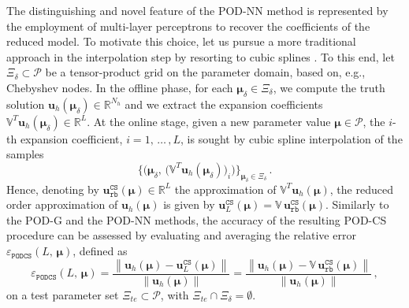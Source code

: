 \documentclass[longtitle]{elsarticle}
\numberwithin{equation}{section}
\theoremstyle{theorem}
\theoremstyle{definition}
\theoremstyle{remark}
\theoremstyle{proposition}
\numberwithin{figure}{section}
\newcommand{\norm}[1]{\left\lVert#1\right\rVert}
\newcommand{\bg}[1]{\boldsymbol{#1}}
\begin{document}
		The distinguishing and novel feature of the POD-NN method is represented by the employment of multi-layer perceptrons to recover the coefficients of the reduced model. To motivate this choice, let us pursue a more traditional approach in the interpolation step by resorting to cubic splines \cite{Deb78}. To this end, let $\Xi_{\delta} \subset \mathcal{P}$ be a tensor-product grid on the parameter domain, based on, e.g., Chebyshev nodes. In the offline phase, for each $\bg{\mu}_{\delta} \in \Xi_{\delta}$, we compute the truth solution $\mathbf{u}_h(\bg{\mu}_{\delta}) \in \mathbb{R}^{N_h}$ and we extract the expansion coefficients $\mathbb{V}^T \mathbf{u}_h(\bg{\mu}_{\delta}) \in \mathbb{R}^L$. At the online stage, given a new parameter value $\bg{\mu} \in \mathcal{P}$, the $i$-th expansion coefficient, $i = 1, \, \ldots \, , L$, is sought by cubic spline interpolation of the samples \[ \big\lbrace \big( \bg{\mu}_{\delta}, \, \big( \mathbb{V}^T \mathbf{u}_h(\bg{\mu}_{\delta}) \big)_i \big) \big\rbrace_{\bg{\mu}_{\delta} \in \Xi_{\delta}} \, . \] Hence, denoting by $\mathbf{u}_{\texttt{rb}}^{\texttt{CS}}(\bg{\mu}) \in \mathbb{R}^L$ the approximation of $\mathbb{V}^T \mathbf{u}_h(\bg{\mu})$, the reduced order approximation of $\mathbf{u}_h(\bg{\mu})$ is given by $\mathbf{u}_L^{\texttt{CS}}(\bg{\mu}) = \mathbb{V} \, \mathbf{u}_{\texttt{rb}}^{\texttt{CS}}(\bg{\mu})$. Similarly to the POD-G and the POD-NN methods, the accuracy of the resulting POD-CS procedure can be assessed by evaluating and averaging the relative error $\varepsilon_{\texttt{PODCS}}^{}(L, \, \bg{\mu})$, defined as
		\begin{equation*}
			\label{eq:podcs-error}
			\varepsilon_{\texttt{PODCS}}^{}(L, \, \bg{\mu}) = \dfrac{\norm{\mathbf{u}_h(\bg{\mu}) - \mathbf{u}_L^{\texttt{CS}}(\bg{\mu})}}{\norm{\mathbf{u}_h(\bg{\mu})}} = \dfrac{\norm{\mathbf{u}_h(\bg{\mu}) - \mathbb{V} \, \mathbf{u}_{\texttt{rb}}^{\texttt{CS}}(\bg{\mu})}}{\norm{\mathbf{u}_h(\bg{\mu})}} \, ,
		\end{equation*}
		on a test parameter set $\Xi_{te} \subset \mathcal{P}$, with $\Xi_{te} \cap \Xi_{\delta} = \emptyset$.
				
\end{document}
